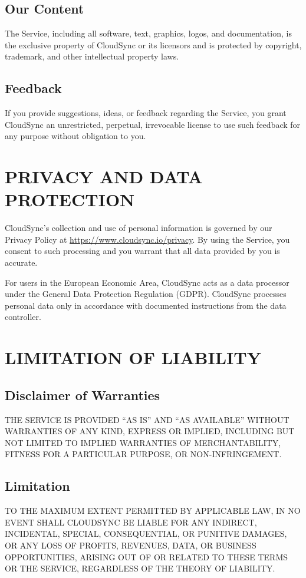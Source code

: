 \documentclass[
    language=english,
    doctype=terms-of-service,
    institution=none,
]{../../omnilatex}
\begin{document}
\subsection{Our Content}
The Service, including all software, text, graphics, logos, and documentation, is the exclusive property of CloudSync or its licensors and is protected by copyright, trademark, and other intellectual property laws.

\subsection{Feedback}
If you provide suggestions, ideas, or feedback regarding the Service, you grant CloudSync an unrestricted, perpetual, irrevocable license to use such feedback for any purpose without obligation to you.

\section{PRIVACY AND DATA PROTECTION}

CloudSync's collection and use of personal information is governed by our Privacy Policy at \url{https://www.cloudsync.io/privacy}. By using the Service, you consent to such processing and you warrant that all data provided by you is accurate.

For users in the European Economic Area, CloudSync acts as a data processor under the General Data Protection Regulation (GDPR). CloudSync processes personal data only in accordance with documented instructions from the data controller.

\section{LIMITATION OF LIABILITY}

\subsection{Disclaimer of Warranties}
THE SERVICE IS PROVIDED ``AS IS'' AND ``AS AVAILABLE'' WITHOUT WARRANTIES OF ANY KIND, EXPRESS OR IMPLIED, INCLUDING BUT NOT LIMITED TO IMPLIED WARRANTIES OF MERCHANTABILITY, FITNESS FOR A PARTICULAR PURPOSE, OR NON-INFRINGEMENT.

\subsection{Limitation}
TO THE MAXIMUM EXTENT PERMITTED BY APPLICABLE LAW, IN NO EVENT SHALL CLOUDSYNC BE LIABLE FOR ANY INDIRECT, INCIDENTAL, SPECIAL, CONSEQUENTIAL, OR PUNITIVE DAMAGES, OR ANY LOSS OF PROFITS, REVENUES, DATA, OR BUSINESS OPPORTUNITIES, ARISING OUT OF OR RELATED TO THESE TERMS OR THE SERVICE, REGARDLESS OF THE THEORY OF LIABILITY.
\end{document}
